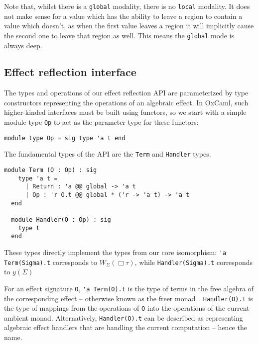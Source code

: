 \documentclass[acmsmall, screen, review, anonymous]{acmart}
\theoremstyle{definition}
\newcommand{\glob}{\mathop{\Box}}
\newcommand{\yoneda}[1]{y(#1)}
\newcommand{\ind}[1]{W_{#1}}
\begin{document}
Note that, whilst there is a \lstinline[style=oxcaml]{global} modality,
there is no \lstinline[style=oxcaml]{local} modality. It does not make
sense for a value which has the ability to leave a region to contain a
value which doesn't, as when the first value leaves a region it will
implicitly cause the second one to leave that region as well. This means
the \lstinline[style=oxcaml]{global} mode is always deep.

\subsection{Effect reflection interface}
\label{sec:interface}

The types and operations of our effect reflection API are parameterized
by type constructors representing the operations of an algebraic
effect. In OxCaml, such higher-kinded interfaces must be built using
functors, so we start with a simple module type
\lstinline[style=oxcaml]{Op} to act as the parameter type for these
functors:
\begin{lstlisting}[style=oxcaml]
  module type Op = sig type 'a t end
\end{lstlisting}
The fundamental types of the API are the \lstinline[style=oxcaml]{Term}
and \lstinline[style=oxcaml]{Handler} types.
\begin{lstlisting}[style=oxcaml]
  module Term (O : Op) : sig
    type 'a t =
      | Return : 'a @@ global -> 'a t
      | Op : 'r O.t @@ global * ('r -> 'a t) -> 'a t
  end

  module Handler(O : Op) : sig
    type t
  end
\end{lstlisting}
These types directly implement the types from our core isomorphism:
\lstinline[style=oxcaml]{'a Term(Sigma).t} corresponds to
$\ind{\Sigma}(\glob \tau)$, while
\lstinline[style=oxcaml]{Handler(Sigma).t} corresponds to
$\yoneda{\Sigma}$

For an effect signature \lstinline[style=oxcaml]{O},
\lstinline[style=oxcaml]{'a Term(O).t} is the type of terms in the free
algebra of the corresponding effect -- otherwise known as the freer
monad~\cite{kiselyov2015freer}. \lstinline[style=oxcaml]{Handler(O).t} is
the type of mappings from the operations of \lstinline[style=oxcaml]{O}
into the operations of the current ambient monad. Alternatively,
\lstinline[style=oxcaml]{Handler(O).t} can be described as representing
algebraic effect handlers that are handling the current computation --
hence the name.
\end{document}
